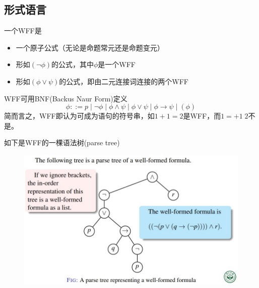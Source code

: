 \subsection{形式语言}
\begin{definition}
一个WFF是
\begin{itemize}
	\item 一个原子公式（无论是命题常元还是命题变元）
	\item 形如$(\lnot\phi)$的公式，其中$\phi$是一个WFF
	\item 形如$(\phi\lor\psi)$的公式，即由二元连接词连接的两个WFF
\end{itemize}
WFF可用BNF(Backus Naur Form)定义
\[\phi::=p\mid
\lnot\phi\mid
\phi\land\psi\mid
\phi\lor\psi\mid
\phi\to\psi\mid
(\phi)\]
简而言之，WFF即认为可成为语句的符号串，如$1+1=2$是WFF，而$1=+1\;2$不是。
\end{definition}
\begin{example}
如下是WFF的一棵语法树(parse tree)
\begin{figure}[H]
\centering
\includegraphics[width=0.8\linewidth]{fig/well-formed_formula.jpg}
\end{figure}
\end{example}

